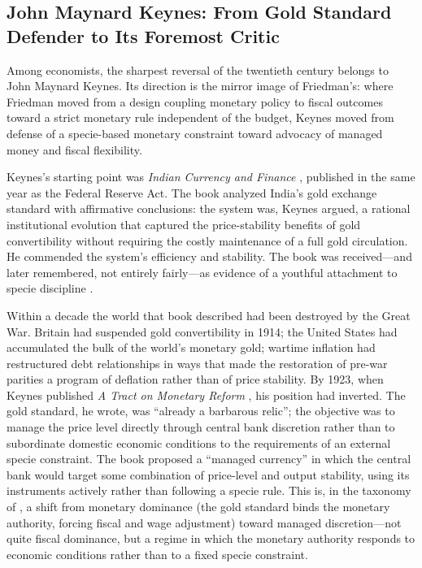 \documentclass[12pt]{article}
\begin{document}
\subsection{John Maynard Keynes: From Gold Standard Defender to
             Its Foremost Critic}

Among economists, the sharpest reversal of the twentieth
century belongs to John Maynard Keynes.  Its direction is the mirror
image of Friedman's: where Friedman moved from a design coupling
monetary policy to fiscal outcomes toward a strict monetary rule
independent of the budget, Keynes moved from defense of a
specie-based monetary constraint toward advocacy of managed money and
fiscal flexibility.

Keynes's starting point was \textit{Indian Currency and Finance}
\citep{Keynes1913}, published in the same year as the Federal Reserve
Act.  The book analyzed India's gold exchange standard with affirmative
conclusions: the system was, Keynes argued, a rational
institutional evolution that captured the price-stability benefits of
gold convertibility without requiring the costly maintenance of a full
gold circulation.  He commended the system's efficiency and stability.
The book was received---and later remembered, not entirely fairly---as
evidence of a youthful attachment to specie discipline \citep{Moggridge1992}.

Within a decade the world that book described had been destroyed by the
Great War.  Britain had suspended gold convertibility in 1914; the United
States had accumulated the bulk of the world's monetary gold; wartime
inflation had restructured debt relationships in ways that made the
restoration of pre-war parities a program of deflation rather than of
price stability.  By 1923, when Keynes published
\textit{A Tract on Monetary Reform} \citep{Keynes1923}, his position
had inverted.  The gold standard, he wrote, was ``already a barbarous
relic''; the objective was to manage the price level directly
through central bank discretion rather than to subordinate domestic
economic conditions to the requirements of an external specie constraint.
The book proposed a ``managed currency'' in which the central bank would
target some combination of price-level and output stability, using its
instruments actively rather than following a specie rule.  This is, in
the taxonomy of \citet{Sargent2011}, a shift from monetary dominance
(the gold standard binds the monetary authority, forcing fiscal and wage
adjustment) toward managed discretion---not quite fiscal dominance, but
a regime in which the monetary authority responds to economic conditions
rather than to a fixed specie constraint.
\end{document}
